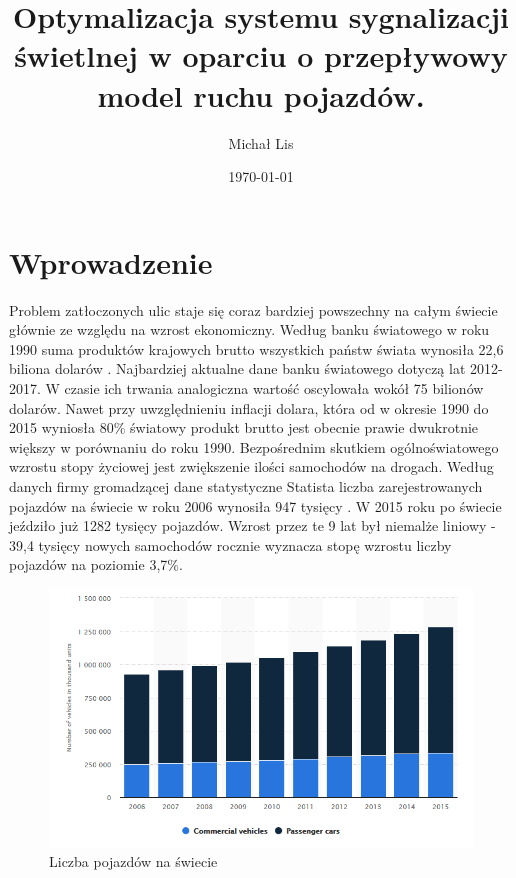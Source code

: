\documentclass[12pt]{book}
\begin{document}
\title{Optymalizacja  systemu sygnalizacji świetlnej w 
oparciu o przepływowy model ruchu pojazdów.}
\author{Michał Lis}
\date{\today}
\maketitle
\tableofcontents
\chapter{Wprowadzenie}
Problem zatłoczonych ulic staje się coraz bardziej powszechny na całym świecie głównie ze względu na wzrost ekonomiczny. Według banku światowego w roku 1990 suma produktów krajowych brutto wszystkich państw świata wynosiła 22,6 biliona dolarów \cite{worldBank}. Najbardziej aktualne dane banku światowego dotyczą lat 2012-2017. W czasie ich trwania analogiczna wartość oscylowała wokół 75 bilionów dolarów. Nawet przy uwzględnieniu inflacji dolara, która od w okresie 1990 do 2015 wyniosła $80\%$ światowy produkt brutto jest obecnie prawie dwukrotnie większy w porównaniu do roku 1990. Bezpośrednim skutkiem ogólnoświatowego wzrostu stopy życiowej jest zwiększenie ilości samochodów na drogach. Według danych firmy gromadzącej dane statystyczne Statista liczba zarejestrowanych pojazdów na świecie w roku 2006 wynosiła 947 tysięcy \cite{liczbaPojazdowSwiat}. W 2015 roku po świecie jeździło już  1282 tysięcy pojazdów. Wzrost przez te 9 lat był niemalże liniowy - 39,4 tysięcy nowych samochodów rocznie wyznacza stopę wzrostu liczby pojazdów na poziomie 3,7$\%$.
\begin{figure}[H]
  \centering
    \includegraphics[width=14cm]{liczbaPojazdowSwiat}
 \caption{Liczba pojazdów na świecie}
 \label{fig:liczbaPojazdowSwiat}
\end{figure} \noindent
\end{document}
